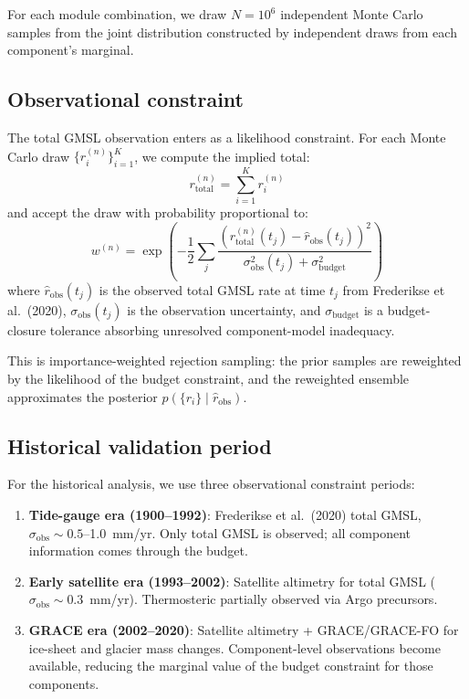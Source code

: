 \documentclass[11pt]{article}
\begin{document}
For each module combination, we draw $N = 10^6$ independent Monte Carlo samples from the joint distribution constructed by independent draws from each component's marginal.

\subsection{Observational constraint}

The total GMSL observation enters as a likelihood constraint.  For each Monte Carlo draw $\{r_i^{(n)}\}_{i=1}^K$, we compute the implied total:
\begin{equation}
  r_{\text{total}}^{(n)} = \sum_{i=1}^K r_i^{(n)}
\end{equation}
and accept the draw with probability proportional to:
\begin{equation}
  w^{(n)} = \exp\!\left(-\frac{1}{2} \sum_j \frac{(r_{\text{total}}^{(n)}(t_j) - \hat{r}_{\text{obs}}(t_j))^2}{\sigma_{\text{obs}}^2(t_j) + \sigma_{\text{budget}}^2}\right)
  \label{eq:weights}
\end{equation}
where $\hat{r}_{\text{obs}}(t_j)$ is the observed total GMSL rate at time $t_j$ from Frederikse et al.\ (2020), $\sigma_{\text{obs}}(t_j)$ is the observation uncertainty, and $\sigma_{\text{budget}}$ is a budget-closure tolerance absorbing unresolved component-model inadequacy.

This is importance-weighted rejection sampling: the prior samples are reweighted by the likelihood of the budget constraint, and the reweighted ensemble approximates the posterior $p(\{r_i\} \mid \hat{r}_{\text{obs}})$.

\subsection{Historical validation period}

For the historical analysis, we use three observational constraint periods:
\begin{enumerate}
  \item \textbf{Tide-gauge era (1900--1992)}: Frederikse et al.\ (2020) total GMSL, $\sigma_{\text{obs}} \sim 0.5$--1.0~mm/yr.  Only total GMSL is observed; all component information comes through the budget.
  \item \textbf{Early satellite era (1993--2002)}: Satellite altimetry for total GMSL ($\sigma_{\text{obs}} \sim 0.3$~mm/yr).  Thermosteric partially observed via Argo precursors.
  \item \textbf{GRACE era (2002--2020)}: Satellite altimetry + GRACE/GRACE-FO for ice-sheet and glacier mass changes.  Component-level observations become available, reducing the marginal value of the budget constraint for those components.
\end{enumerate}
\end{document}
